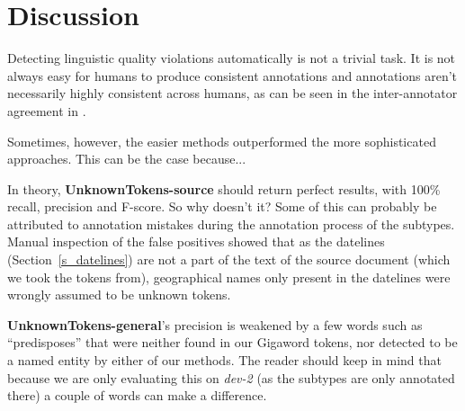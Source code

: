 \documentclass[a4paper,10pt]{scrartcl}
\theoremstyle{style}
\begin{document}




\section{Discussion}
\label{discussion}
Detecting linguistic quality violations automatically is not a trivial task. It is not always easy for humans to produce consistent annotations and annotations aren't necessarily highly consistent across humans, as can be seen in the inter-annotator agreement in \cite{friedrichlqvsumm}.

Sometimes, however, the easier methods outperformed the more sophisticated approaches. This can be the case because...

In theory, \textbf{UnknownTokens-source} should return perfect results, with 100\% recall, precision and F-score. So why doesn't it? Some of this can probably be attributed to annotation mistakes during the annotation process of the subtypes. Manual inspection of the false positives showed that as the datelines (Section~\ref{s_datelines}) are not a part of the text of the source document (which we took the tokens from), geographical names only present in the datelines were wrongly assumed to be unknown tokens. %

\textbf{UnknownTokens-general}'s precision is weakened by a few words such as ``predisposes'' that were neither found in our Gigaword tokens, nor detected to be a named entity by either of our methods. The reader should keep in mind that because we are only evaluating this on \textit{dev-2} (as the subtypes are only annotated there) a couple of words can make a difference.
\end{document}

